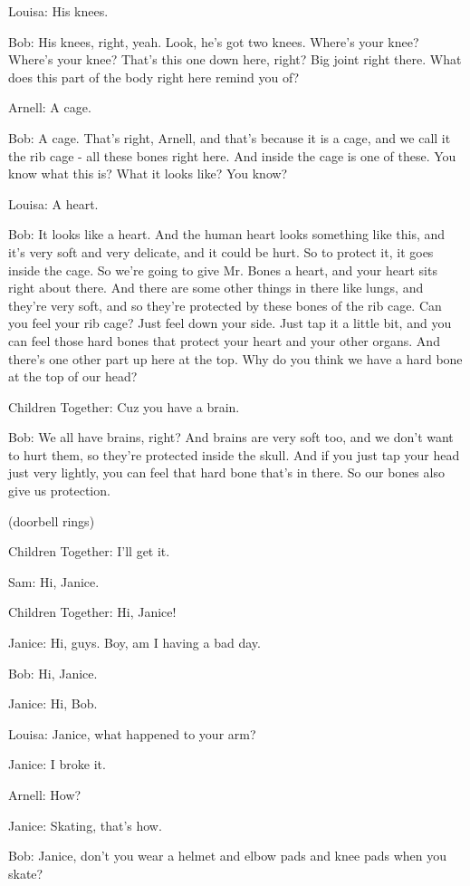 Louisa: His knees.

Bob: His knees, right, yeah. Look, he's got two knees. Where's your knee? Where's your knee? That's this one down here, right? Big joint right there. What does this part of the body right here remind you of?

Arnell: A cage.

Bob: A cage. That's right, Arnell, and that's because it is a cage, and we call it the rib cage - all these bones right here. And inside the cage is one of these. You know what this is? What it looks like? You know?

Louisa: A heart.

Bob: It looks like a heart. And the human heart looks something like this, and it's very soft and very delicate, and it could be hurt. So to protect it, it goes inside the cage. So we're going to give Mr. Bones a heart, and your heart sits right about there. And there are some other things in there like lungs, and they're very soft, and so they're protected by these bones of the rib cage. Can you feel your rib cage? Just feel down your side. Just tap it a little bit, and you can feel those hard bones that protect your heart and your other organs. And there's one other part up here at the top. Why do you think we have a hard bone at the top of our head?

Children Together: Cuz you have a brain.

Bob: We all have brains, right? And brains are very soft too, and we don't want to hurt them, so they're protected inside the skull. And if you just tap your head just very lightly, you can feel that hard bone that's in there. So our bones also give us protection.

(doorbell rings)

Children Together: I'll get it.

Sam: Hi, Janice.

Children Together: Hi, Janice!

Janice: Hi, guys. Boy, am I having a bad day.

Bob: Hi, Janice.

Janice: Hi, Bob.

Louisa: Janice, what happened to your arm?

Janice: I broke it.

Arnell: How?

Janice: Skating, that's how.

Bob: Janice, don't you wear a helmet and elbow pads and knee pads when you skate?

